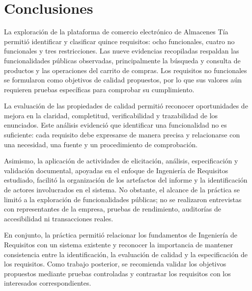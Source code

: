 \documentclass[12pt,a4paper]{article}
\begin{document}

\section{Conclusiones}

La exploración de la plataforma de comercio electrónico de Almacenes Tía permitió identificar y clasificar quince requisitos: ocho funcionales, cuatro no funcionales y tres restricciones. Las nueve evidencias recopiladas respaldan las funcionalidades públicas observadas, principalmente la búsqueda y consulta de productos y las operaciones del carrito de compras. Los requisitos no funcionales se formularon como objetivos de calidad propuestos, por lo que sus valores aún requieren pruebas específicas para comprobar su cumplimiento.

La evaluación de las propiedades de calidad permitió reconocer oportunidades de mejora en la claridad, completitud, verificabilidad y trazabilidad de los enunciados. Este análisis evidenció que identificar una funcionalidad no es suficiente: cada requisito debe expresarse de manera precisa y relacionarse con una necesidad, una fuente y un procedimiento de comprobación.

Asimismo, la aplicación de actividades de elicitación, análisis, especificación y validación documental, apoyadas en el enfoque de Ingeniería de Requisitos estudiado, facilitó la organización de los artefactos del informe y la identificación de actores involucrados en el sistema. No obstante, el alcance de la práctica se limitó a la exploración de funcionalidades públicas; no se realizaron entrevistas con representantes de la empresa, pruebas de rendimiento, auditorías de accesibilidad ni transacciones reales.

En conjunto, la práctica permitió relacionar los fundamentos de Ingeniería de Requisitos con un sistema existente y reconocer la importancia de mantener consistencia entre la identificación, la evaluación de calidad y la especificación de los requisitos. Como trabajo posterior, se recomienda validar los objetivos propuestos mediante pruebas controladas y contrastar los requisitos con los interesados correspondientes.

\clearpage


\end{document}
